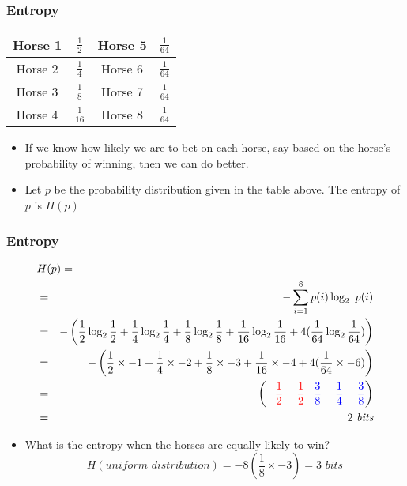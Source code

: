 \documentclass[handout]{beamer}
\begin{document}
\begin{frame}
\frametitle{Entropy}
\begin{center}
\begin{tabular}{|cc|cc|}
\hline
Horse 1 & $\frac{1}{2}$ & Horse 5 & $\frac{1}{64}$ \\
\hline
Horse 2 & $\frac{1}{4}$ & Horse 6 & $\frac{1}{64}$ \\
\hline
Horse 3 & $\frac{1}{8}$ & Horse 7 & $\frac{1}{64}$ \\
\hline
Horse 4 & $\frac{1}{16}$ & Horse 8 & $\frac{1}{64}$ \\
\hline
\end{tabular}
\end{center}
\begin{itemize}[<+->]
\item If we know how likely we are to bet on each horse, say based on
  the horse's probability of winning, then we can do better.
\item Let $p$ be the probability distribution given in the
table above. The entropy of $p$ is $H(p)$
\end{itemize}

\end{frame}

\begin{frame}
\frametitle{Entropy}
\begin{eqnarray*}
\lefteqn{ H(p) = } \nonumber \\
&=& - \sum^{8}_{i=1} p(i) \log_2\ p(i) \nonumber \\
&=& - \left( \frac{1}{2} \log_2 \frac{1}{2} + \frac{1}{4} \log_2 \frac{1}{4} +
\frac{1}{8} \log_2 \frac{1}{8} + \frac{1}{16} \log_2 \frac{1}{16} +
4 (\frac{1}{64} \log_2 \frac{1}{64}) \right) \nonumber \\
&=& - \left( \frac{1}{2} \times -1 + \frac{1}{4} \times -2 +
\frac{1}{8} \times -3 + \frac{1}{16} \times -4 +
4 (\frac{1}{64} \times -6 ) \right) \nonumber \\
&=& - \left( {\color{red}-\frac{1}{2} - \frac{1}{2}} {\color{blue} - \frac{3}{8} - \frac{1}{4} - \frac{3}{8}} \right) \nonumber \\
&=& 2\ \textit{bits}
\end{eqnarray*}

\begin{itemize}[<+->]
\item What is the entropy when the horses are equally likely to win?
\[ H(\textit{uniform distribution}) = - 8 (\frac{1}{8} \times -3) = 3 \textit{ bits} \]
\end{itemize}

\end{frame}
\end{document}
